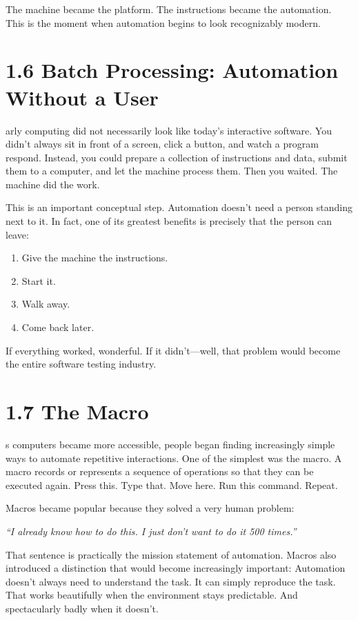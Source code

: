 \documentclass[11pt, a4paper, openany]{book}
\newcommand{\initialcap}[1]{{\fontfamily{lmss}\selectfont\huge\textbf{#1}}}
\begin{document}
The machine became the platform. The instructions became the automation. This is the moment when automation begins to look recognizably modern.

\section{1.6 Batch Processing: Automation Without a User}
\noindent \initialcap{E}arly computing did not necessarily look like today's interactive software. You didn't always sit in front of a screen, click a button, and watch a program respond. Instead, you could prepare a collection of instructions and data, submit them to a computer, and let the machine process them. Then you waited. The machine did the work.

This is an important conceptual step. Automation doesn't need a person standing next to it. In fact, one of its greatest benefits is precisely that the person can leave:
\begin{enumerate}
    \item Give the machine the instructions.
    \item Start it.
    \item Walk away.
    \item Come back later.
\end{enumerate}
If everything worked, wonderful. If it didn't---well, that problem would become the entire software testing industry.

\section{1.7 The Macro}
\noindent \initialcap{A}s computers became more accessible, people began finding increasingly simple ways to automate repetitive interactions. One of the simplest was the macro. A macro records or represents a sequence of operations so that they can be executed again. Press this. Type that. Move here. Run this command. Repeat.

Macros became popular because they solved a very human problem:
\begin{center}
\textit{``I already know how to do this. I just don't want to do it 500 times.''}
\end{center}
That sentence is practically the mission statement of automation. Macros also introduced a distinction that would become increasingly important: Automation doesn't always need to understand the task. It can simply reproduce the task. That works beautifully when the environment stays predictable. And spectacularly badly when it doesn't.
\end{document}
